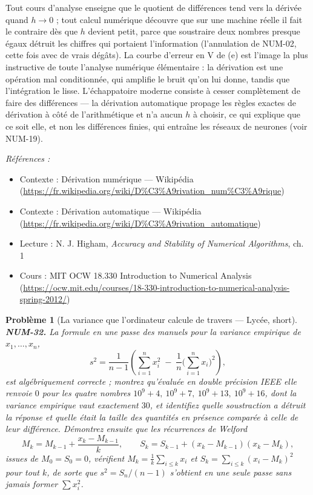 \documentclass[11pt]{article}
\newtheorem{problem}{Problème}
\newenvironment{refs}{\par\small\noindent\emph{Références :}\begin{itemize}\setlength\itemsep{0pt}}{\end{itemize}\normalsize}
\begin{document}
\noindent Tout cours d'analyse enseigne que le quotient de différences tend vers la dérivée quand $h \to 0$ ; tout calcul numérique découvre que sur une machine réelle il fait le contraire dès que $h$ devient petit, parce que soustraire deux nombres presque égaux détruit les chiffres qui portaient l'information (l'annulation de NUM-02, cette fois avec de vrais dégâts). La courbe d'erreur en V de (e) est l'image la plus instructive de toute l'analyse numérique élémentaire : la dérivation est une opération mal conditionnée, qui amplifie le bruit qu'on lui donne, tandis que l'intégration le lisse. L'échappatoire moderne consiste à cesser complètement de faire des différences --- la dérivation automatique propage les règles exactes de dérivation à côté de l'arithmétique et n'a aucun $h$ à choisir, ce qui explique que ce soit elle, et non les différences finies, qui entraîne les réseaux de neurones (voir NUM-19).

\begin{refs}
\item Contexte : Dérivation numérique --- Wikipédia (\url{https://fr.wikipedia.org/wiki/D%C3%A9rivation_num%C3%A9rique})
\item Contexte : Dérivation automatique --- Wikipédia (\url{https://fr.wikipedia.org/wiki/D%C3%A9rivation_automatique})
\item Lecture : N. J. Higham, \textit{Accuracy and Stability of Numerical Algorithms}, ch. 1
\item Cours : MIT OCW 18.330 Introduction to Numerical Analysis (\url{https://ocw.mit.edu/courses/18-330-introduction-to-numerical-analysis-spring-2012/})
\end{refs}

\bigskip

\begin{problem}[{La variance que l'ordinateur calcule de travers --- Lycée, short}]
\textbf{NUM-32.} La formule en une passe des manuels pour la variance empirique de $x_1, \ldots, x_n$,
\[ s^2 = \frac{1}{n-1}\left( \sum_{i=1}^{n} x_i^2 \;-\; \frac{1}{n}\Big(\sum_{i=1}^{n} x_i\Big)^{\!2} \right), \]
est algébriquement correcte ; montrez qu'évaluée en double précision IEEE elle renvoie $0$ pour les quatre nombres $10^9 + 4,\ 10^9 + 7,\ 10^9 + 13,\ 10^9 + 16$, dont la variance empirique vaut exactement $30$, et identifiez quelle soustraction a détruit la réponse et quelle était la taille des quantités en présence comparée à celle de leur différence. Démontrez ensuite que les récurrences de Welford
\[ M_k = M_{k-1} + \frac{x_k - M_{k-1}}{k}, \qquad S_k = S_{k-1} + (x_k - M_{k-1})(x_k - M_k), \]
issues de $M_0 = S_0 = 0$, vérifient $M_k = \tfrac{1}{k}\sum_{i \le k} x_i$ et $S_k = \sum_{i \le k} (x_i - M_k)^2$ pour tout $k$, de sorte que $s^2 = S_n/(n-1)$ s'obtient en une seule passe sans jamais former $\sum x_i^2$.
\end{problem}
\end{document}
